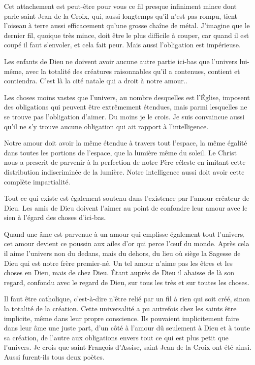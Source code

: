 \documentclass[french,twoside]{book} %
\begin{document}
Cet attachement est peut-être pour vous ce fil presque infiniment mince dont parle saint Jean de la Croix, qui, aussi longtemps qu'il n'est pas rompu, tient l'oiseau à terre aussi efficacement qu'une grosse chaîne de métal. J'imagine que le dernier fil, quoique très mince, doit être le plus difficile à couper, car quand il est coupé il faut s'envoler, et cela fait peur. Mais aussi l'obligation est impérieuse.\par
Les enfants de Dieu ne doivent avoir aucune autre partie ici-bas que l'univers lui-même, avec la totalité des créatures raisonnables qu'il a contenues, contient et contiendra. C'est là la cité natale qui a droit à notre amour..\par
Les choses moins vastes que l'univers, au nombre desquelles est l'Église, imposent des obligations qui peuvent être extrêmement étendues, mais parmi lesquelles ne se trouve pas l'obligation d'aimer. Du moins je le crois. Je suis convaincue aussi qu'il ne s'y trouve aucune obligation qui ait rapport à l'intelligence.\par
Notre amour doit avoir la même étendue à travers tout l'espace, la même égalité dans toutes les portions de l'espace, que la lumière même du soleil. Le Christ nous a prescrit de parvenir à la perfection de notre Père céleste en imitant cette distribution indiscriminée de la lumière. Notre intelligence aussi doit avoir cette complète impartialité.\par
Tout ce qui existe est également soutenu dans l'existence par l'amour créateur de Dieu. Les amis de Dieu doivent l'aimer au point de confondre leur amour avec le sien à l'égard des choses d'ici-bas.\par
Quand une âme est parvenue à un amour qui emplisse également tout l'univers, cet amour devient ce poussin aux ailes d'or qui perce l'œuf du monde. Après cela il aime l'univers non du dedans, mais du dehors, du lieu où siège la Sagesse de Dieu qui est notre frère premier-né. Un tel amour n'aime pas les êtres et les choses en Dieu, mais de chez Dieu. Étant auprès de Dieu il abaisse de là son regard, confondu avec le regard de Dieu, sur tous les très et sur toutes les choses.\par
Il faut être catholique, c'est-à-dire n'être relié par un fil à rien qui soit créé, sinon la totalité de la création. Cette universalité a pu autrefois chez les saints être implicite, même dans leur propre conscience. Ils pouvaient implicitement faire dans leur âme une juste part, d'un côté à l'amour dû seulement à Dieu et à toute sa création, de l'autre aux obligations envers tout ce qui est plus petit que l'univers. Je crois que saint François d'Assise, saint Jean de la Croix ont été ainsi. Aussi furent-ils tous deux poètes.\par
\end{document}
